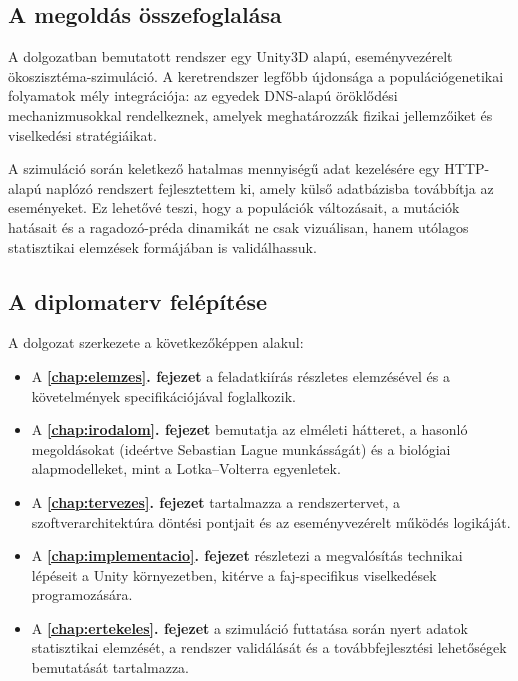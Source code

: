 \subsection{A megoldás összefoglalása}
A dolgozatban bemutatott rendszer egy Unity3D alapú, eseményvezérelt ökoszisztéma-szimuláció. A keretrendszer legfőbb újdonsága a populációgenetikai folyamatok mély integrációja: az egyedek DNS-alapú öröklődési mechanizmusokkal rendelkeznek, amelyek meghatározzák fizikai jellemzőiket és viselkedési stratégiáikat.

A szimuláció során keletkező hatalmas mennyiségű adat kezelésére egy HTTP-alapú naplózó rendszert fejlesztettem ki, amely külső adatbázisba továbbítja az eseményeket. Ez lehetővé teszi, hogy a populációk változásait, a mutációk hatásait és a ragadozó-préda dinamikát ne csak vizuálisan, hanem utólagos statisztikai elemzések formájában is validálhassuk.

\subsection{A diplomaterv felépítése}
A dolgozat szerkezete a következőképpen alakul:

\begin{itemize}
    \item A \textbf{\ref{chap:elemzes}. fejezet} a feladatkiírás részletes elemzésével és a követelmények specifikációjával foglalkozik.
    \item A \textbf{\ref{chap:irodalom}. fejezet} bemutatja az elméleti hátteret, a hasonló megoldásokat (ideértve Sebastian Lague munkásságát) és a biológiai alapmodelleket, mint a Lotka–Volterra egyenletek.
    \item A \textbf{\ref{chap:tervezes}. fejezet} tartalmazza a rendszertervet, a szoftverarchitektúra döntési pontjait és az eseményvezérelt működés logikáját.
    \item A \textbf{\ref{chap:implementacio}. fejezet} részletezi a megvalósítás technikai lépéseit a Unity környezetben, kitérve a faj-specifikus viselkedések programozására.
    \item A \textbf{\ref{chap:ertekeles}. fejezet} a szimuláció futtatása során nyert adatok statisztikai elemzését, a rendszer validálását és a továbbfejlesztési lehetőségek bemutatását tartalmazza.
\end{itemize}